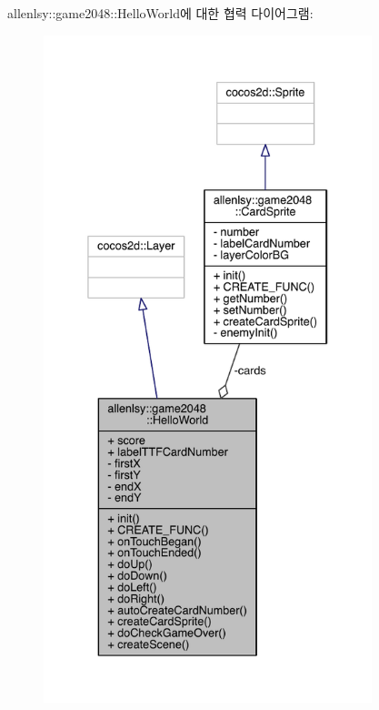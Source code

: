 allenlsy\+:\+:game2048\+:\+:Hello\+World에 대한 협력 다이어그램\+:
\nopagebreak
\begin{figure}[H]
\begin{center}
\leavevmode
\includegraphics[height=550pt]{db/d46/classallenlsy_1_1game2048_1_1_hello_world__coll__graph}
\end{center}
\end{figure}
